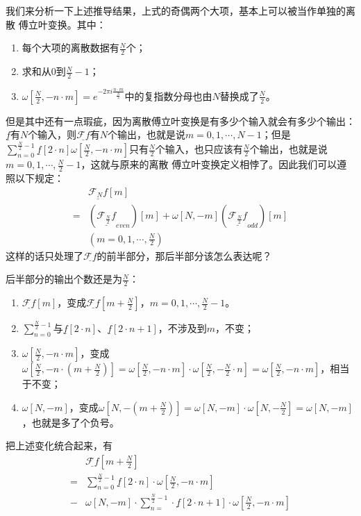 我们来分析一下上述推导结果，上式的奇偶两个大项，基本上可以被当作单独的离散 傅立叶变换。其中：
\begin{enumerate}
	\item 每个大项的离散数据有$\frac{N}{2}$个；
	\item 求和从$0$到$\frac{N}{2}-1$；
	\item $\omega[\frac{N}{2},-n\cdot m] = e^{-2\pi i\frac{n\cdot m}{\frac{N}{2}}}$中的复指数分母也由$N$替换成了$\frac{N}{2}$。
\end{enumerate}

但是其中还有一点瑕疵，因为离散傅立叶变换是有多少个输入就会有多少个输出：$\underline{f}$有$N$个输入，则$\underline{\mathcal{F}f}$有$N$个输出，也就是说$m =0,1,\cdots,N-1$；但是$\sum\limits_{n=0}^{\frac{N}{2}-1}\underline{f}[2\cdot n]\omega[\frac{N}{2},-n\cdot m]$只有$\frac{N}{2}$个输入，也只应该有$\frac{N}{2}$个输出，也就是说$m= 0,1,\cdots,\frac{N}{2}-1$，这就与原来的离散 傅立叶变换定义相悖了。因此我们可以遵照以下规定：
\begin{align*}
	  & \underline{\mathcal{F}_N f}[m]                                                                                                             \\
	= & \left( \underline{\mathcal{F}_{\frac{N}{2}}f}_{even} \right)[m]+\omega[N,-m]\left( \underline{\mathcal{F}_{\frac{N}{2}}f}_{odd} \right)[m] \\
	  & (m=0,1, \cdots,\frac{N}{2})
\end{align*}
这样的话只处理了$\underline{\mathcal{F}f}$的前半部分，那后半部分该怎么表达呢？

后半部分的输出个数还是为$\frac{N}{2}$：
\begin{enumerate}
	\item $\underline{\mathcal{F}f}[m]$，变成$\underline{\mathcal{F}f}[m+\frac{N}{2}]$，$m = 0,1,\cdots,\frac{N}{2}-1$。
	\item $\sum\limits_{n=0}^{\frac{N}{2}-1}$与$\underline{f}[2\cdot n]$、$\underline{f}[2\cdot n+1]$，不涉及到$m$，不变；
	\item $\omega[\frac{N}{2},-n\cdot m]$，变成$\omega[\frac{N}{2},-n\cdot (m+\frac{N}{2})] = \omega[\frac{N}{2},-n\cdot m]\cdot \omega[\frac{N}{2},-\frac{N}{2}\cdot n] = \omega[\frac{N}{2},-n\cdot m]$，相当于不变；
	\item $\omega[N,-m]$，变成$\omega[N,-(m+\frac{N}{2})] = \omega[N,-m]\cdot \omega[N,-\frac{N}{2}] = \omega[N,-m]$，也就是多了个负号。
\end{enumerate}

把上述变化统合起来，有
\begin{align*}
	  & \underline{\mathcal{F}f}[m+\frac{N}{2}]                                                                       \\
	= & \sum_{n=0}^{\frac{N}{2}-1}\underline{f}[2\cdot n]\cdot \omega[\frac{N}{2},-n\cdot m]                          \\
	- & \omega[N,-m]\cdot \sum_{n=}^{\frac{N}{2}-1}\cdot \underline{f}[2\cdot n+1]\cdot \omega[\frac{N}{2},-n\cdot m]
\end{align*}

